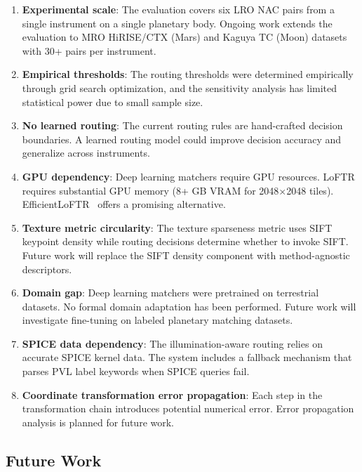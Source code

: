 \documentclass[lettersize,journal]{IEEEtran}
\begin{document}
\begin{enumerate}
    \item \textbf{Experimental scale}: The evaluation covers six LRO NAC pairs from a single instrument on a single planetary body. Ongoing work extends the evaluation to MRO HiRISE/CTX (Mars) and Kaguya TC (Moon) datasets with 30+ pairs per instrument.

    \item \textbf{Empirical thresholds}: The routing thresholds were determined empirically through grid search optimization, and the sensitivity analysis has limited statistical power due to small sample size.

    \item \textbf{No learned routing}: The current routing rules are hand-crafted decision boundaries. A learned routing model could improve decision accuracy and generalize across instruments.

    \item \textbf{GPU dependency}: Deep learning matchers require GPU resources. LoFTR requires substantial GPU memory (8+ GB VRAM for 2048$\times$2048 tiles). EfficientLoFTR~\cite{wang2024efficientloftr} offers a promising alternative.

    \item \textbf{Texture metric circularity}: The texture sparseness metric uses SIFT keypoint density while routing decisions determine whether to invoke SIFT. Future work will replace the SIFT density component with method-agnostic descriptors.

    \item \textbf{Domain gap}: Deep learning matchers were pretrained on terrestrial datasets. No formal domain adaptation has been performed. Future work will investigate fine-tuning on labeled planetary matching datasets.

    \item \textbf{SPICE data dependency}: The illumination-aware routing relies on accurate SPICE kernel data. The system includes a fallback mechanism that parses PVL label keywords when SPICE queries fail.

    \item \textbf{Coordinate transformation error propagation}: Each step in the transformation chain introduces potential numerical error. Error propagation analysis is planned for future work.
\end{enumerate}

\subsection{Future Work}
\end{document}
